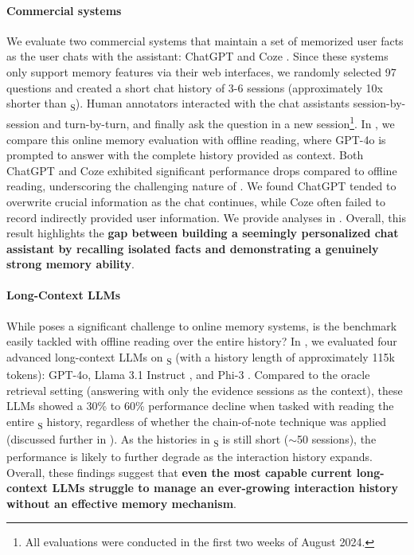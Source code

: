 \paragraph{Commercial systems} We evaluate two commercial systems that maintain a set of memorized user facts as the user chats with the assistant: ChatGPT \citep{openai_memory_2024} and Coze \citep{coze_memory_2024}. Since these systems only support memory features via their web interfaces, we randomly selected 97 questions and created a short chat history of 3-6 sessions (approximately 10x shorter than \BENCHMARK\textsubscript{\textsc{S}}). Human annotators interacted with the chat assistants session-by-session and turn-by-turn, and finally ask the question in a new session\footnote{All evaluations were conducted in the first two weeks of August 2024.}. In , we compare this online memory evaluation with offline reading, where GPT-4o is prompted to answer with the complete history provided as context. Both ChatGPT and Coze exhibited significant performance drops compared to offline reading, underscoring the challenging nature of \BENCHMARK{}. We found ChatGPT tended to overwrite crucial information as the chat continues, while Coze often failed to record indirectly provided user information. We provide analyses in . Overall, this result highlights the \textbf{gap between building a seemingly personalized chat assistant by recalling isolated facts and demonstrating a genuinely strong memory ability}.




\paragraph{Long-Context LLMs} While \BENCHMARK{} poses a significant challenge to online memory systems, is the benchmark easily tackled with offline reading over the entire history? In , we evaluated four advanced long-context LLMs on \BENCHMARK\textsubscript{\textsc{S}} (with a history length of approximately 115k tokens): GPT-4o, Llama 3.1 Instruct \citep{dubey2024llama}, and Phi-3 \citep{phi-3-technical-report}. Compared to the oracle retrieval setting (answering with only the evidence sessions as the context), these LLMs showed a 30\% to 60\% performance decline when tasked with reading the entire \BENCHMARK\textsubscript{\textsc{S}} history, regardless of whether the chain-of-note technique \citep{yu2023chain} was applied (discussed further in ). As the histories in \BENCHMARK\textsubscript{\textsc{S}} is still short ($\sim$50 sessions), the performance is likely to further degrade as the interaction history expands. Overall, these findings suggest that \textbf{even the most capable current long-context LLMs struggle to manage an ever-growing interaction history without an effective memory mechanism}.

